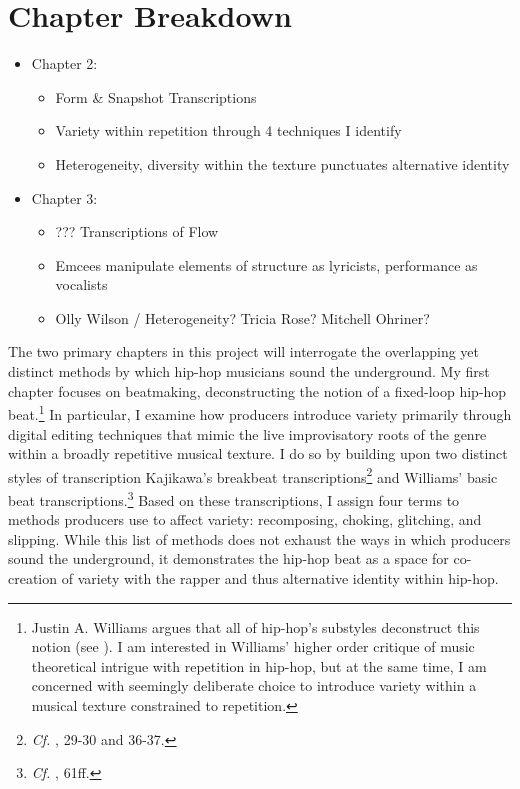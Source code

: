 \section{Chapter Breakdown}
\begin{itemize}
    \item Chapter 2: 
        \begin{itemize}
            \item Form \& Snapshot Transcriptions
            \item Variety within repetition through 4 techniques I identify
            \item Heterogeneity, diversity within the texture punctuates alternative identity
        \end{itemize}
    \item Chapter 3:
        \begin{itemize}
            \item ??? Transcriptions of Flow
            \item Emcees manipulate elements of structure as lyricists, performance as vocalists
            \item Olly Wilson / Heterogeneity? Tricia Rose? Mitchell Ohriner?
        \end{itemize}
\end{itemize}

The two primary chapters in this project will interrogate the overlapping yet distinct methods
by which hip-hop musicians sound the underground. My first chapter focuses on beatmaking, deconstructing 
the notion of a fixed-loop hip-hop beat.\footnote{Justin A. Williams argues that all of hip-hop's 
substyles deconstruct this notion (see \cite{justinawilliamsBeatsFlowsResponse2009}). I am interested 
in Williams' higher order critique of music theoretical intrigue with repetition in hip-hop, but at 
the same time, I am concerned with seemingly deliberate choice to introduce variety within a musical 
texture constrained to repetition.} In particular, I examine how producers introduce variety primarily
through digital editing techniques that mimic the live improvisatory roots of the genre within a broadly
repetitive musical texture. I do so by building upon two distinct styles of transcription\textemdash
Kajikawa's breakbeat  transcriptions\footnote{\textit{Cf.} \cite{lorenkajikawaSoundingRaceRap2015}, 29-30 
and 36-37.} and Williams' basic beat transcriptions.\footnote{\textit{Cf.} \cite{justinawilliamsRhyminStealinMusical2013}, 61ff.} Based on these transcriptions, I assign four 
terms to methods producers use to affect variety: recomposing, choking, glitching, and slipping. While 
this list of methods does not exhaust the ways in which producers sound the underground, it demonstrates 
the hip-hop beat as a space for co-creation of variety with the rapper and thus alternative identity 
within hip-hop.

